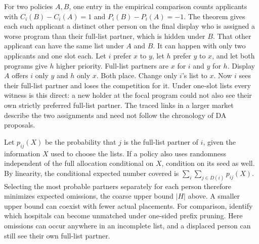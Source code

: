 For two policies $A,B$, one entry in the empirical comparison counts applicants with $C_i(B)-C_i(A)=1$ and $P_i(B)-P_i(A)=-1$. The theorem gives each such applicant a distinct other person on the final display who is assigned a worse program than their full-list partner, which is hidden under $B$. That other applicant can have the same list under $A$ and $B$. It can happen with only two applicants and one slot each. Let $i$ prefer $x$ to $y$, let $h$ prefer $y$ to $x$, and let both programs give $h$ higher priority. Full-list partners are $x$ for $i$ and $y$ for $h$. Display $A$ offers $i$ only $y$ and $h$ only $x$. Both place. Change only $i$'s list to $x$. Now $i$ sees their full-list partner and loses the competition for it. Under one-slot lists every witness is this direct: a new holder at the focal program could not also see their own strictly preferred full-list partner. The traced links in a larger market describe the two assignments and need not follow the chronology of DA proposals.

Let $p_{ij}(X)$ be the probability that $j$ is the full-list partner of $i$, given the information $X$ used to choose the lists. If a policy also uses randomness independent of the full allocation conditional on $X$, condition on its seed as well. By linearity, the conditional expected number covered is $\sum_i\sum_{j\in D(i)}p_{ij}(X)$. Selecting the most probable partners separately for each person therefore minimizes expected omissions, the coarse upper bound $|H|$ above. A smaller upper bound can coexist with fewer actual placements. For comparison, \citet[Theorem~4.7]{pruned} identify which hospitals can become unmatched under one-sided prefix pruning. Here omissions can occur anywhere in an incomplete list, and a displaced person can still see their own full-list partner.
